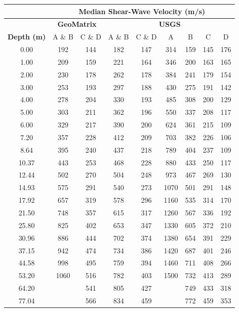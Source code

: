 \documentclass[11pt]{report}
\begin{document}
\begin{table}[tbp]
  \centering
  \begin{tabular}{ccc|cccccc}
	\hline\hline
	& \multicolumn{8}{c}{\textbf{Median Shear-Wave Velocity (m/s)}} \\
	\hline
	& \multicolumn{2}{c|}{\textbf{GeoMatrix}} 
	& \multicolumn{6}{c}{\textbf{USGS}} \\
	\hline
	\textbf{Depth (m)} & A \& B & C \& D & A \& B & C \& D &
	A & B & C & D  \\
	\hline
	0.00 &  192 & 144 & 182 & 147 &  314 & 159 & 145 & 176 \\
	1.00 &  209 & 159 & 221 & 164 &  346 & 200 & 163 & 165 \\
	2.00 &  230 & 178 & 262 & 178 &  384 & 241 & 179 & 154 \\
	3.00 &  253 & 193 & 297 & 188 &  430 & 275 & 191 & 142 \\
	4.00 &  278 & 204 & 330 & 193 &  485 & 308 & 200 & 129 \\
	5.00 &  303 & 211 & 362 & 196 &  550 & 337 & 208 & 117 \\
	6.00 &  329 & 217 & 390 & 200 &  624 & 361 & 215 & 109 \\
	7.20 &  357 & 228 & 412 & 209 &  703 & 382 & 226 & 106 \\
	8.64 &  395 & 240 & 437 & 218 &  789 & 404 & 237 & 109 \\
	10.37 &  443 & 253 & 468 & 228 &  880 & 433 & 250 & 117 \\
	12.44 &  502 & 270 & 504 & 248 &  973 & 467 & 269 & 130 \\
	14.93 &  575 & 291 & 540 & 273 & 1070 & 501 & 291 & 148 \\
	17.92 &  657 & 319 & 578 & 296 & 1160 & 535 & 314 & 170 \\
	21.50 &  748 & 357 & 615 & 317 & 1260 & 567 & 336 & 192 \\
	25.80 &  825 & 402 & 653 & 347 & 1330 & 605 & 372 & 210 \\
	30.96 &  886 & 444 & 702 & 374 & 1380 & 654 & 391 & 229 \\
	37.15 &  942 & 474 & 734 & 386 & 1420 & 687 & 401 & 246 \\
	44.58 &  998 & 495 & 759 & 394 & 1460 & 711 & 408 & 266 \\
	53.20 & 1060 & 516 & 782 & 403 & 1500 & 732 & 413 & 289 \\
	64.20 &      & 541 & 805 & 427 &      & 749 & 433 & 318 \\
	77.04 &      & 566 & 834 & 459 &      & 772 & 459 & 353 \\

\end{tabular}
\end{table}
\end{document}
